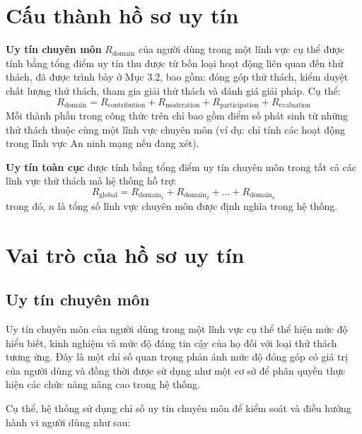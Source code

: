 \section{Cấu thành hồ sơ uy tín}

\textbf{Uy tín chuyên môn} $R_{\text{domain}}$ của người dùng trong một lĩnh vực cụ thể được tính bằng tổng điểm uy tín thu được từ bốn loại hoạt động liên quan đến thử thách,
đã được trình bày ở Mục 3.2, bao gồm: đóng góp thử thách, kiểm duyệt chất lượng thử thách, tham gia giải thử thách và đánh giá giải pháp. Cụ thể:
\[R_{\text{domain}} = R_{\text{contribution}} + R_{\text{moderation}} + R_{\text{participation}} + R_{\text{evaluation}} \]
Mỗi thành phần trong công thức trên chỉ bao gồm điểm số phát sinh từ những thử thách thuộc cùng một lĩnh vực chuyên môn (ví dụ: chỉ tính các hoạt động trong lĩnh vực An ninh mạng nếu đang xét).

\textbf{Uy tín toàn cục} được tính bằng tổng điểm uy tín chuyên môn trong tất cả các lĩnh vực thử thách mà hệ thống hỗ trợ:
\[R_{\text{global}} = R_{\text{domain}_1} + R_{\text{domain}_2} + ... + R_{\text{domain}_n}\]
trong đó, $n$ là tổng số lĩnh vực chuyên môn được định nghĩa trong hệ thống.

\section{Vai trò của hồ sơ uy tín}

\subsection{Uy tín chuyên môn}

Uy tín chuyên môn của người dùng trong một lĩnh vực cụ thể thể hiện mức độ hiểu biết, kinh nghiệm và mức độ đáng tin cậy của họ đối với loại thử thách tương ứng.
Đây là một chỉ số quan trọng phản ánh mức độ đóng góp có giá trị của người dùng và đồng thời được sử dụng như một cơ sở để phân quyền thực hiện các chức năng nâng cao trong hệ thống.

Cụ thể, hệ thống sử dụng chỉ số uy tín chuyên môn để kiểm soát và điều hướng hành vi người dùng như sau:

